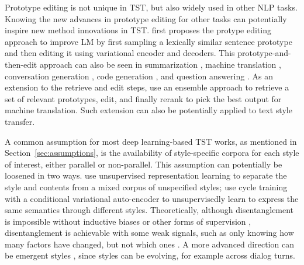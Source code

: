 Prototype editing is not unique in TST, but also widely used in other NLP tasks. Knowing the new advances in prototype editing for other tasks can potentially inspire new method innovations in TST.  first proposes the protype editing approach to improve LM by first sampling a lexically similar sentence prototype and then editing it using variational encoder and decoders. This prototype-and-then-edit approach can also be seen in summarization , machine translation , conversation generation , code generation , and question answering . As an extension to the retrieve and edit steps,  use an ensemble approach to retrieve a set of relevant prototypes, edit, and finally rerank to pick the best output for machine translation. Such extension can also be potentially applied to text style transfer.

\label{sec:loosening}
A common assumption for most deep learning-based TST works, as mentioned in Section~\ref{sec:assumptions}, is the availability of style-specific corpora for each style of interest, either parallel or non-parallel.
This assumption can potentially be loosened in two ways.
  use unsupervised representation learning to separate the style and contents from a mixed corpus of unspecified styles;  use cycle training with a conditional variational auto-encoder to unsupervisedly learn to express the same semantics through different styles. Theoretically, although disentanglement is impossible without inductive biases or other forms of supervision , disentanglement is achievable with some weak signals, such as only knowing how many factors have changed, but not which ones . A more advanced direction can be emergent styles , since styles can be evolving, for example across dialog turns.

